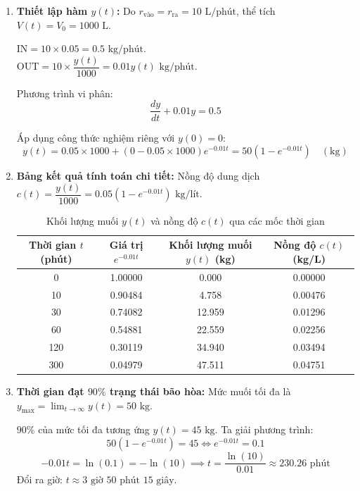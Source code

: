 \documentclass[14pt]{extarticle}
\begin{document}
\begin{enumerate}
    \item \textbf{Thiết lập hàm $y(t)$:}
    Do $r_{\text{vào}} = r_{\text{ra}} = 10\text{ L/phút}$, thể tích $V(t) = V_0 = 1000\text{ L}$.
    
    $\text{IN} = 10 \times 0.05 = 0.5\text{ kg/phút}$.\\
    $\text{OUT} = 10 \times \dfrac{y(t)}{1000} = 0.01 y(t)\text{ kg/phút}$.
    
    Phương trình vi phân:
    $$\frac{dy}{dt} + 0.01 y = 0.5$$
    
    Áp dụng công thức nghiệm riêng với $y(0) = 0$:
    $$y(t) = 0.05 \times 1000 + (0 - 0.05 \times 1000) e^{-0.01 t} = 50\left(1 - e^{-0.01t}\right) \quad (\text{kg})$$

    \item \textbf{Bảng kết quả tính toán chi tiết:}
    Nồng độ dung dịch $c(t) = \dfrac{y(t)}{1000} = 0.05\left(1 - e^{-0.01t}\right)\text{ kg/lít}$.

    \begin{table}[htbp]
    \centering
    \caption{Khối lượng muối $y(t)$ và nồng độ $c(t)$ qua các mốc thời gian}
    \begin{tabular}{c c c c}
        \toprule
        \textbf{Thời gian $t$ (phút)} & \textbf{Giá trị $e^{-0.01t}$} & \textbf{Khối lượng muối $y(t)$ (kg)} & \textbf{Nồng độ $c(t)$ (kg/L)} \\
        \midrule
        0 & 1.00000 & 0.000 & 0.00000 \\
        10 & 0.90484 & 4.758 & 0.00476 \\
        30 & 0.74082 & 12.959 & 0.01296 \\
        60 & 0.54881 & 22.559 & 0.02256 \\
        120 & 0.30119 & 34.940 & 0.03494 \\
        300 & 0.04979 & 47.511 & 0.04751 \\
        \bottomrule
    \end{tabular}
    \end{table}

    \item \textbf{Thời gian đạt $90\%$ trạng thái bão hòa:}
    Mức muối tối đa là $y_{\max} = \lim_{t \to \infty} y(t) = 50\text{ kg}$.
    
    $90\%$ của mức tối đa tương ứng $y(t) = 45\text{ kg}$. Ta giải phương trình:
    $$50\left(1 - e^{-0.01t}\right) = 45 \iff e^{-0.01t} = 0.1$$
    $$-0.01t = \ln(0.1) = -\ln(10) \implies t = \frac{\ln(10)}{0.01} \approx 230.26\text{ phút}$$
    Đổi ra giờ: $t \approx 3\text{ giờ } 50\text{ phút } 15\text{ giây}$.
\end{enumerate}
\end{document}
